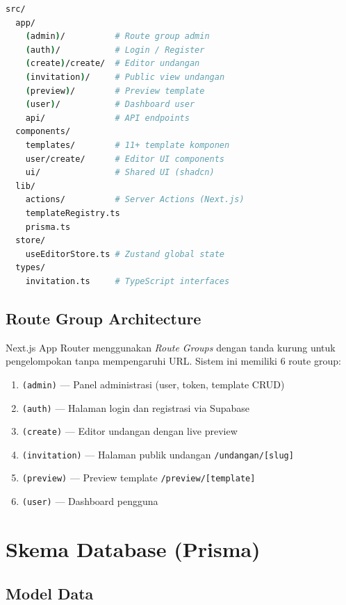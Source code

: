 \documentclass[12pt,a4paper]{article}
\begin{document}
\begin{lstlisting}[language=bash, caption=Struktur Direktori Utama]
src/
  app/
    (admin)/          # Route group admin
    (auth)/           # Login / Register
    (create)/create/  # Editor undangan
    (invitation)/     # Public view undangan
    (preview)/        # Preview template
    (user)/           # Dashboard user
    api/              # API endpoints
  components/
    templates/        # 11+ template komponen
    user/create/      # Editor UI components
    ui/               # Shared UI (shadcn)
  lib/
    actions/          # Server Actions (Next.js)
    templateRegistry.ts
    prisma.ts
  store/
    useEditorStore.ts # Zustand global state
  types/
    invitation.ts     # TypeScript interfaces
\end{lstlisting}

\subsection{Route Group Architecture}

Next.js App Router menggunakan \textit{Route Groups} dengan tanda kurung
untuk pengelompokan tanpa mempengaruhi URL. Sistem ini memiliki 6 route group:

\begin{enumerate}
  \item \texttt{(admin)} --- Panel administrasi (user, token, template CRUD)
  \item \texttt{(auth)} --- Halaman login dan registrasi via Supabase
  \item \texttt{(create)} --- Editor undangan dengan live preview
  \item \texttt{(invitation)} --- Halaman publik undangan \texttt{/undangan/[slug]}
  \item \texttt{(preview)} --- Preview template \texttt{/preview/[template]}
  \item \texttt{(user)} --- Dashboard pengguna
\end{enumerate}

\section{Skema Database (Prisma)}

\subsection{Model Data}
\end{document}
